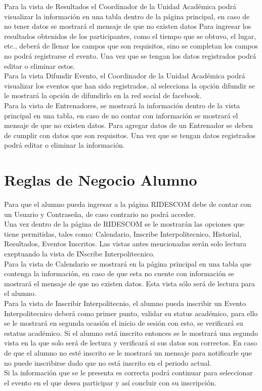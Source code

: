 \noindent Para la vista de Resultados el Coordinador de la Unidad Académica podrá visualizar la información en una tabla dentro de la página principal, en caso de no tener datos se mostrará el mensaje de que no existen datos Para ingresar los resultados obtenidos de los participantes, como el tiempo que se obtuvo, el lugar, etc., deberá de llenar los campos que son requisitos, sino se completan los campos no podrá registrarse el evento. Una vez que se tengan los datos registrados podrá editar o eliminar estos.\\

\noindent Para la vista Difundir Evento, el Coordinador de la Unidad Académica podrá visualizar los eventos que han sido registrados, al selecciona la opción difundir se le mostrará la opción de difundirlo en la red social de facebook.\\

\noindent Para la vista de Entrenadores, se mostrará la información dentro de la vista principal en una tabla, en caso de no contar con información se mostrará el mensaje de que no existen datos. Para agregar datos de un Entrenador se deben de cumplir con datos que son requisitos. Una vez que se tengan datos registrados podrá editar o eliminar la información. \\

\section{Reglas de Negocio Alumno}
Para que el alumno pueda ingresar a la página RIDESCOM debe de contar con un Usuario y Contraseña, de caso contrario no podrá acceder.\\

Una vez dentro de la página de RIDESCOM se le mostrarán las opciones que tiene permitidas, tales como: Calendario, Inscribe Interpolitecnico, Historial,  Resultados, Eventos Inscritos. Las vistas antes mencionadas serán solo lectura exeptuando la vista de INscribe Interpolitecnico.\\

Para la vista de Calendario se mostrará en la página principal en una tabla que contenga la información, en caso de que esta no cuente con información se mostrará el mensaje de que no existen datos. Esta vista sólo será de lectura para el alumno.\\

Para la vista de Inscribir Interpolitecnio, el alumno pueda inscribir un Evento Interpolitecnico deberá como primer punto, validar su status académico, para ello se le mostrará en segunda ocasión el inicio de sesión con esto, se verificará su estatus académico. Si el alumno está inscrito entonces se le mostrará una segundo vista en la que solo será de lectura y verificará si sus datos son correctos. En caso de que el alumno no esté inscrito se le mostrará un mensaje para notificarle que no puede inscribirse dado que no está inscrito en el periodo actual. \\
Si la información que se le presenta es correcta podrá continuar para seleccionar el evento en el que desea participar y así concluir con su inscripción. \\

